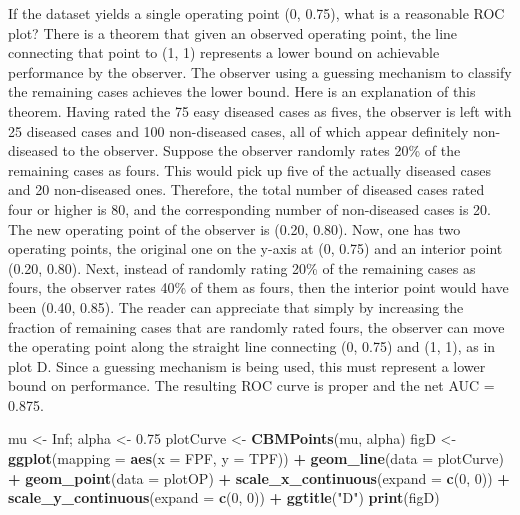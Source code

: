 \documentclass[
]{book}
\newenvironment{Shaded}{\begin{snugshade}}{\end{snugshade}}
\newcommand{\DataTypeTok}[1]{\textcolor[rgb]{0.13,0.29,0.53}{#1}}
\newcommand{\DecValTok}[1]{\textcolor[rgb]{0.00,0.00,0.81}{#1}}
\newcommand{\FloatTok}[1]{\textcolor[rgb]{0.00,0.00,0.81}{#1}}
\newcommand{\KeywordTok}[1]{\textcolor[rgb]{0.13,0.29,0.53}{\textbf{#1}}}
\newcommand{\NormalTok}[1]{#1}
\newcommand{\OperatorTok}[1]{\textcolor[rgb]{0.81,0.36,0.00}{\textbf{#1}}}
\newcommand{\OtherTok}[1]{\textcolor[rgb]{0.56,0.35,0.01}{#1}}
\newcommand{\StringTok}[1]{\textcolor[rgb]{0.31,0.60,0.02}{#1}}
\begin{document}
If the dataset yields a single operating point (0, 0.75), what is a reasonable ROC plot? There is a theorem that given an observed operating point, the line connecting that point to (1, 1) represents a lower bound on achievable performance by the observer. The observer using a guessing mechanism to classify the remaining cases achieves the lower bound. Here is an explanation of this theorem. Having rated the 75 easy diseased cases as fives, the observer is left with 25 diseased cases and 100 non-diseased cases, all of which appear definitely non-diseased to the observer. Suppose the observer randomly rates 20\% of the remaining cases as fours. This would pick up five of the actually diseased cases and 20 non-diseased ones. Therefore, the total number of diseased cases rated four or higher is 80, and the corresponding number of non-diseased cases is 20. The new operating point of the observer is (0.20, 0.80). Now, one has two operating points, the original one on the y-axis at (0, 0.75) and an interior point (0.20, 0.80). Next, instead of randomly rating 20\% of the remaining cases as fours, the observer rates 40\% of them as fours, then the interior point would have been (0.40, 0.85). The reader can appreciate that simply by increasing the fraction of remaining cases that are randomly rated fours, the observer can move the operating point along the straight line connecting (0, 0.75) and (1, 1), as in plot D. Since a guessing mechanism is being used, this must represent a lower bound on performance. The resulting ROC curve is proper and the net AUC = 0.875.

\begin{Shaded}
\begin{Highlighting}[]
\NormalTok{mu <-}\StringTok{ }\OtherTok{Inf}\NormalTok{; alpha <-}\StringTok{ }\FloatTok{0.75}
\NormalTok{plotCurve <-}\StringTok{ }\KeywordTok{CBMPoints}\NormalTok{(mu, alpha)}
\NormalTok{figD <-}\StringTok{ }\KeywordTok{ggplot}\NormalTok{(}\DataTypeTok{mapping =} \KeywordTok{aes}\NormalTok{(}\DataTypeTok{x =}\NormalTok{ FPF, }\DataTypeTok{y =}\NormalTok{ TPF)) }\OperatorTok{+}\StringTok{ }
\StringTok{  }\KeywordTok{geom_line}\NormalTok{(}\DataTypeTok{data =}\NormalTok{ plotCurve) }\OperatorTok{+}\StringTok{ }
\StringTok{  }\KeywordTok{geom_point}\NormalTok{(}\DataTypeTok{data =}\NormalTok{ plotOP)  }\OperatorTok{+}\StringTok{ }
\StringTok{  }\KeywordTok{scale_x_continuous}\NormalTok{(}\DataTypeTok{expand =} \KeywordTok{c}\NormalTok{(}\DecValTok{0}\NormalTok{, }\DecValTok{0}\NormalTok{)) }\OperatorTok{+}\StringTok{ }
\StringTok{  }\KeywordTok{scale_y_continuous}\NormalTok{(}\DataTypeTok{expand =} \KeywordTok{c}\NormalTok{(}\DecValTok{0}\NormalTok{, }\DecValTok{0}\NormalTok{)) }\OperatorTok{+}
\StringTok{  }\KeywordTok{ggtitle}\NormalTok{(}\StringTok{"D"}\NormalTok{)}
\KeywordTok{print}\NormalTok{(figD)}
\end{Highlighting}
\end{Shaded}
\end{document}
